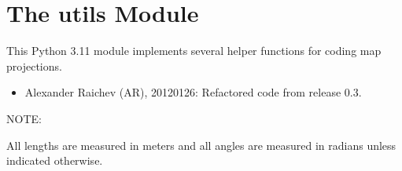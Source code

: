 \documentclass[a4paper,12ptopenany,oneside,english]{sphinxmanual}
\begin{document}
\chapter{The utils Module}
\label{\detokenize{utils:module-rhealpixdggs.utils}}\label{\detokenize{utils:the-utils-module}}\label{\detokenize{utils::doc}}
\sphinxAtStartPar
This Python 3.11 module implements several helper functions for coding map projections.
\begin{itemize}
\item {} 
\sphinxAtStartPar
Alexander Raichev (AR), 2012\sphinxhyphen{}01\sphinxhyphen{}26: Refactored code from release 0.3.

\end{itemize}

\sphinxAtStartPar
NOTE:

\sphinxAtStartPar
All lengths are measured in meters and all angles are measured in radians
unless indicated otherwise.
\end{document}
